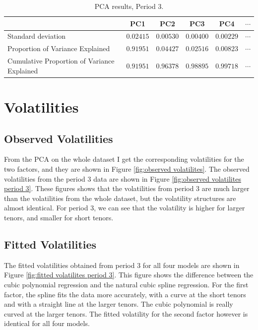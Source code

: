 \begin{table}[!htbp]
\centering
\begin{tabular}{|m{9em}|c|c|c|c|c|} 
\cline{2-6}
\multicolumn{1}{c|}{} & PC1 & PC2 & PC3 & PC4 & $\cdots$ \\ \hline
Standard deviation & $0.02415$ & $0.00530$ & $0.00400$ & $0.00229$ & $\cdots$ \\ \hline
Proportion of Variance Explained & $0.91951$ & $0.04427$ & $0.02516$ & $0.00823$ & $\cdots$ \\
\hline
Cumulative Proportion of Variance Explained & $0.91951$ & $0.96378$ & $0.98895$ & $0.99718$ & $\cdots$ \\
\hline
\end{tabular}
\caption[PCA results, Period 3.]{PCA results, Period 3.}
\label{table:pca results period 3}
\end{table}



\section{Volatilities}

\subsection{Observed Volatilities}

\noindent From the PCA on the whole dataset I get the corresponding volatilities for the two factors, and they are shown in Figure \ref{fig:observed volatilites}. The observed volatilities from the period $3$ data are shown in Figure \ref{fig:observed volatilites period 3}. These figures shows that the volatilities from period 3 are much larger than the volatilities from the whole dataset, but the volatility structures are almost identical. For period 3, we can see that the volatility is higher for larger tenors, and smaller for short tenors.

\subsection{Fitted Volatilities}

\noindent The fitted volatilities obtained from period 3 for all four models are shown in Figure \ref{fig:fitted volatilites period 3}. This figure shows the difference between the cubic polynomial regression and the natural cubic spline regression. For the first factor, the spline fits the data more accurately, with a curve at the short tenors and with a straight line at the larger tenors. The cubic polynomial is really curved at the larger tenors. The fitted volatility for the second factor however is identical for all four models.

